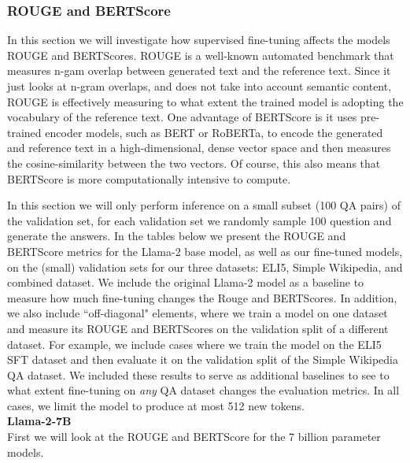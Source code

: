 \documentclass[11pt, oneside]{article}   	%
\begin{document}
\subsubsection{ROUGE and BERTScore}
In this section we will investigate how supervised fine-tuning affects the models ROUGE and BERTScores.
ROUGE is a well-known automated benchmark that measures n-gam overlap between generated text and the reference text.
Since it just looks at n-gram overlaps, and does not take into account semantic content, ROUGE is effectively measuring to what extent the trained model is adopting the vocabulary of the reference text.
One advantage of BERTScore is it uses pre-trained encoder models, such as BERT or RoBERTa, to encode the generated and reference text in a high-dimensional, dense vector space and then measures the cosine-similarity between the two vectors.
Of course, this also means that BERTScore is more computationally intensive to compute.

In this section we will only perform inference on a small subset (100 QA pairs) of the validation set, for each validation set we randomly sample 100 question and generate the answers.
In the tables below we present the ROUGE and BERTScore metrics for the Llama-2 base model, as well as our fine-tuned models, on the (small) validation sets for our three datasets: ELI5, Simple Wikipedia, and combined dataset.
We include the original Llama-2 model as a baseline to measure how much fine-tuning changes the Rouge and BERTScores.
In addition, we also include ``off-diagonal" elements, where we train a model on one dataset and measure its ROUGE and BERTScores on the validation split of a different dataset.
For example, we include cases where we train the model on the ELI5 SFT dataset and then evaluate it on the validation split of the Simple Wikipedia QA dataset.
We included these results to serve as additional baselines to see to what extent fine-tuning on \textit{any} QA dataset changes the evaluation metrics.
In all cases, we limit the model to produce at most 512 new tokens.
\\[10pt]
\textbf{Llama-2-7B}
\\[10pt]
First we will look at the ROUGE and BERTScore for the 7 billion parameter models.
\end{document}
